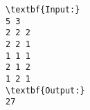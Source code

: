\begin{verbatim}
\textbf{Input:}
5 3
2 2 2
2 2 1
1 1 1
2 1 2
1 2 1
\textbf{Output:} 
27\end{verbatim}